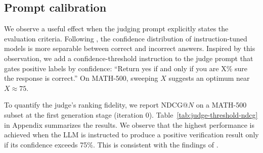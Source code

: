 \documentclass{article}
\theoremstyle{plain}
\theoremstyle{definition}
\theoremstyle{remark}
\begin{document}
\subsection{Prompt calibration}
\label{sec:prompt-calibration-trick}
We observe a useful effect when the judging prompt explicitly states the evaluation criteria. Following \citet{kalai2025language}, the confidence distribution of instruction-tuned models is more separable between correct and incorrect answers. Inspired by this observation, we add a confidence-threshold instruction to the judge prompt that gates positive labels by confidence: ``Return yes if and only if you are X\% sure the response is correct.'' On MATH-500, sweeping \(X\) suggests an optimum near \(X\approx 75\).

To quantify the judge's ranking fidelity, we report NDCG@\(N\) on a MATH-500 subset at the first generation stage (iteration 0). Table~\ref{tab:judge-threshold-ndcg} in Appendix summarizes the results. We observe that the highest performance is achieved when the LLM is instructed to produce a positive verification result only if its confidence exceeds 75\%. This is consistent with the findings of \citet{kalai2025language}.



\end{document}
